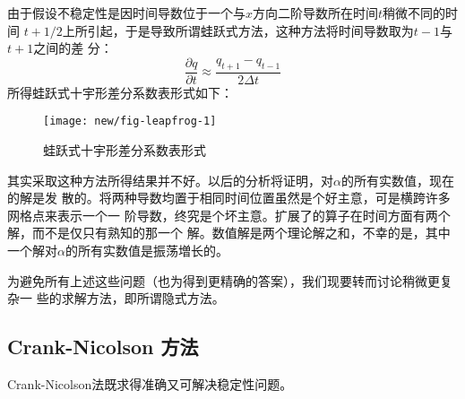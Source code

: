 由于假设不稳定性是因时间导数位于一个与$x$方向二阶导数所在时间$t$稍微不同的时间
$t+1/2$上所引起，于是导致所谓蛙跃式方法，这种方法将时间导数取为$t-1$与$t+1$之间的差
分：
\begin{equation}
\frac{\partial q}{\partial t}\approx \frac{q_{t+1}-q_{t-1}}{2\Delta t}
\label{eq:ex2.2.10}
\end{equation}
所得蛙跃式十宇形差分系数表形式如下：
\begin{figure}[H]
\centering
\texttt{[image: new/fig-leapfrog-1]}
\caption[fig-leapforg-1]{蛙跃式十宇形差分系数表形式}
\label{fig:new/fig-leapfrog-1}
\end{figure}
其实采取这种方法所得结果并不好。以后的分析将证明，对$\alpha$的所有实数值，现在的解是发
散的。将两种导数均置于相同时间位置虽然是个好主意，可是横跨许多网格点来表示一个一
阶导数，终究是个坏主意。扩展了的算子在时间方面有两个解，而不是仅只有熟知的那一个
解。数值解是两个理论解之和，不幸的是，其中一个解对$\alpha$的所有实数值是振荡増长的。

为避免所有上述这些问题（也为得到更精确的答案），我们现要转而讨论稍微更复杂一
些的求解方法，即所谓隐式方法。
\subsection{Crank-Nicolson 方法}
Crank-Nicolson法既求得准确又可解决稳定性问题。

